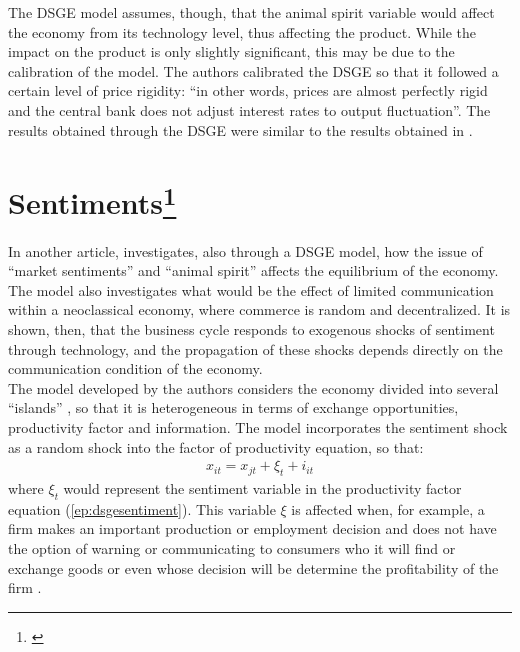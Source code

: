 The DSGE model assumes, though, that the animal spirit variable would affect the economy from its technology level, thus affecting the product. While the impact on the product is only slightly significant, this may be due to the calibration of the model. The authors calibrated the DSGE so that it followed a certain level of price rigidity: ``in other words, prices are almost perfectly rigid and the central bank does not adjust interest rates to output fluctuation''\cite[p.1365]{ barsky2012information}. The results obtained through the DSGE were similar to the results obtained in \cite{l2009news}.\\

\section{Sentiments\protect\footnote{\cite{angeletos2013sentiments}}}

In another article, \cite{angeletos2013sentiments} investigates, also through a DSGE model, how the issue of ``market sentiments'' and ``animal spirit'' affects the equilibrium of the economy. The model also investigates what would be the effect of limited communication within a neoclassical economy, where commerce is random and decentralized. It is shown, then, that the business cycle responds to exogenous shocks of sentiment through technology, and the propagation of these shocks depends directly on the communication condition of the economy.\\

The model developed by the authors considers the economy divided into several ``islands'' \cite{lucas1972expectations}, so that it is heterogeneous in terms of exchange opportunities, productivity factor and information. The model incorporates the sentiment shock as a random shock into the factor of productivity equation, so that:
\begin{align} \label{ep:dsgesentiment}
     x_{it} = x_{jt} + \xi_t + i_{it}
\end{align}
where $\xi_t$ would represent the sentiment variable in the productivity factor equation (\ref{ep:dsgesentiment}). This variable $\xi$ is affected when, for example, a firm makes an important production or employment decision and does not have the option of warning or communicating to consumers who it will find or exchange goods or even whose decision will be determine the profitability of the firm \cite[p.741]{angeletos2013sentiments}.\\

